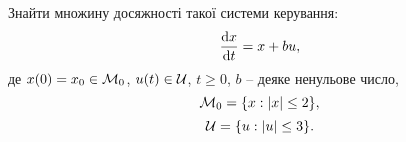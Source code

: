 \begin{problem}
    Знайти множину досяжності такої системи керування:
    \[\frac{\mathop{}\!\mathrm{d} x}{\mathop{}\!\mathrm{d} t} = x + bu,\] 
    де $x(0) = x_0 \in \mathcal{M}_0$, $u(t)\in \mathcal{U}$, $t\ge0$, $b$ -- деяке ненульове число, 
    \[ \mathcal{M}_0 = \{ x : | x | \le 2 \}, \]
    \[ \mathcal{U} = \{ u : |u| \le 3 \}. \]
\end{problem}

    
    
    
    
    

